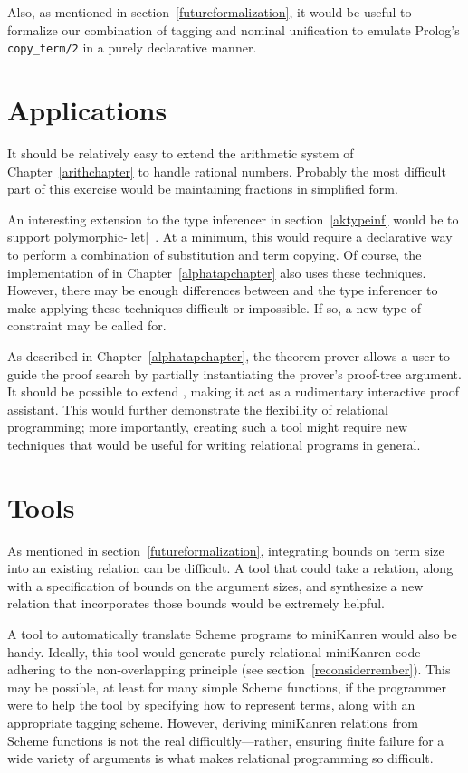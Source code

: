 Also, as mentioned in section~\ref{futureformalization}, it would be
useful to formalize our combination of tagging and nominal unification
to emulate Prolog's \mbox{{\tt copy\_term/2}} in a purely declarative manner.



\section{Applications}\label{futureapplications}

It should be relatively easy to extend the arithmetic system of
Chapter~\ref{arithchapter} to handle rational numbers.  Probably the
most difficult part of this exercise would be maintaining fractions in
simplified form.

An interesting extension to the type inferencer in
section~\ref{aktypeinf} would be to support
polymorphic-\scheme|let|~\cite{tapl}.  At a minimum, this would
require a declarative way to perform a combination of substitution and
term copying.  Of course, the implementation of \alphatapsp in
Chapter~\ref{alphatapchapter} also uses these techniques.  However,
there may be enough differences between \alphatapsp and the type
inferencer to make applying these techniques difficult or impossible.
If so, a new type of constraint may be called for.

As described in Chapter~\ref{alphatapchapter}, the \alphatapsp theorem
prover allows a user to guide the proof search by partially
instantiating the prover's proof-tree argument.  It should be possible
to extend \alphatap, making it act as a rudimentary interactive proof
assistant.  This would further demonstrate the flexibility of
relational programming; more importantly, creating such a tool might
require new techniques that would be useful for writing relational
programs in general.



\section{Tools}\label{futuretools}

As mentioned in section~\ref{futureformalization}, integrating bounds
on term size into an existing relation can be difficult.  A tool that
could take a relation, along with a specification of bounds on the
argument sizes, and synthesize a new relation that incorporates those
bounds would be extremely helpful.

A tool to automatically translate Scheme programs to miniKanren would
also be handy.  Ideally, this tool would generate purely relational
miniKanren code adhering to the non-overlapping principle (see
section~\ref{reconsiderrember}).  This may be possible, at least for
many simple Scheme functions, if the programmer were to help the tool
by specifying how to represent terms, along with an appropriate
tagging scheme.  However, deriving miniKanren relations from Scheme
functions is not the real difficultly---rather, ensuring finite
failure for a wide variety of arguments is what makes relational
programming so difficult.


